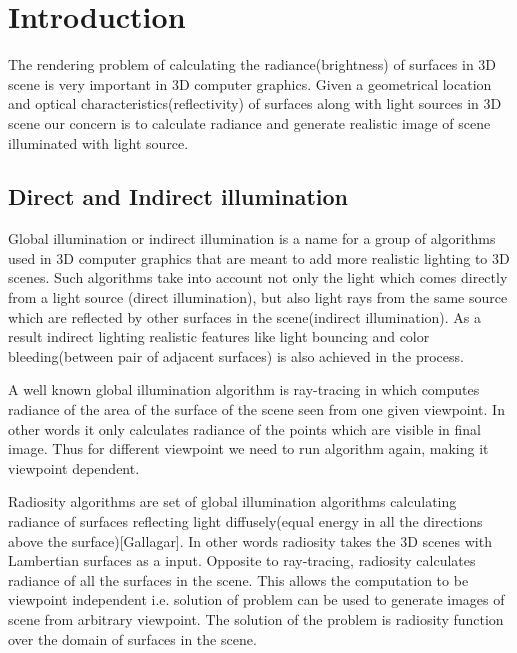 \chapter{\label{Intro}Introduction}

The rendering problem of calculating the radiance(brightness) of surfaces in 3D scene is very important in 3D computer graphics. Given a geometrical location and optical characteristics(reflectivity) of surfaces along with light sources in 3D scene our concern is to calculate radiance and generate realistic image of scene illuminated with light source.

\section{Direct and Indirect illumination}
Global illumination or indirect illumination is a name for a group of algorithms used in 3D computer graphics that are meant to add more realistic lighting to 3D scenes. Such algorithms take into account not only the light which comes directly from a light source (direct illumination), but also light rays from the same source which are reflected by other surfaces in the scene(indirect illumination).
As a result indirect lighting realistic features like light bouncing and color bleeding(between pair of adjacent surfaces) is also achieved in the process.

A well known global illumination algorithm is ray-tracing \cite{Whitted} in which computes  radiance of the area of the surface of the scene
seen from one given viewpoint. In other words it only calculates radiance of the points which are visible in final image. Thus for different viewpoint we need to run algorithm again, making it viewpoint dependent.

Radiosity algorithms are set of global illumination algorithms calculating radiance of surfaces reflecting light diffusely(equal energy in all the directions above the surface)[Gallagar]. In other words radiosity takes the 3D scenes with Lambertian surfaces as a input. Opposite to ray-tracing, radiosity calculates radiance of all the surfaces in the scene. This allows the computation to be viewpoint independent i.e. solution of problem can be used to generate images of scene from arbitrary viewpoint. The solution of the problem is radiosity function over the domain of surfaces in the scene.

